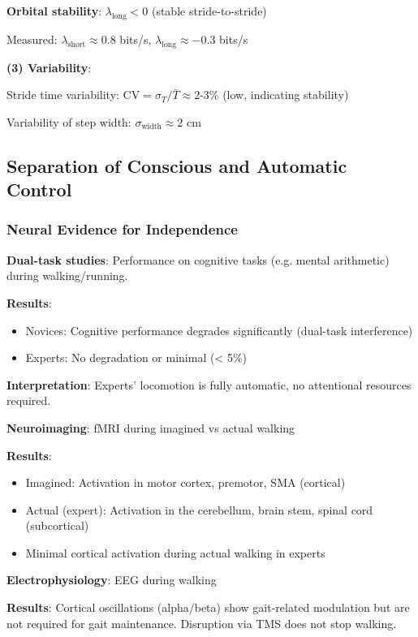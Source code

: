 \documentclass[11pt,onecolumn]{article}
\begin{document}
\textbf{Orbital stability}: $\lambda_{\text{long}} < 0$ (stable stride-to-stride)

Measured: $\lambda_{\text{short}} \approx 0.8$ bits/s, $\lambda_{\text{long}} \approx -0.3$ bits/s

\textbf{(3) Variability}:

Stride time variability: $\text{CV} = \sigma_T / \bar{T} \approx 2$-3\% (low, indicating stability)

Variability of step width: $\sigma_{\text{width}} \approx 2$ cm

\subsection{Separation of Conscious and Automatic Control}

\subsubsection{Neural Evidence for Independence}

\textbf{Dual-task studies}: Performance on cognitive tasks (e.g. mental arithmetic) during walking/running.

\textbf{Results}:
\begin{itemize}
\item Novices: Cognitive performance degrades significantly (dual-task interference)
\item Experts: No degradation or minimal (< 5\%)
\end{itemize}

\textbf{Interpretation}: Experts' locomotion is fully automatic, no attentional resources required.

\textbf{Neuroimaging}: fMRI during imagined vs actual walking

\textbf{Results}:
\begin{itemize}
\item Imagined: Activation in motor cortex, premotor, SMA (cortical)
\item Actual (expert): Activation in the cerebellum, brain stem, spinal cord (subcortical)
\item Minimal cortical activation during actual walking in experts
\end{itemize}

\textbf{Electrophysiology}: EEG during walking

\textbf{Results}: Cortical oscillations (alpha/beta) show gait-related modulation but are not required for gait maintenance. Disruption via TMS does not stop walking.
\end{document}
